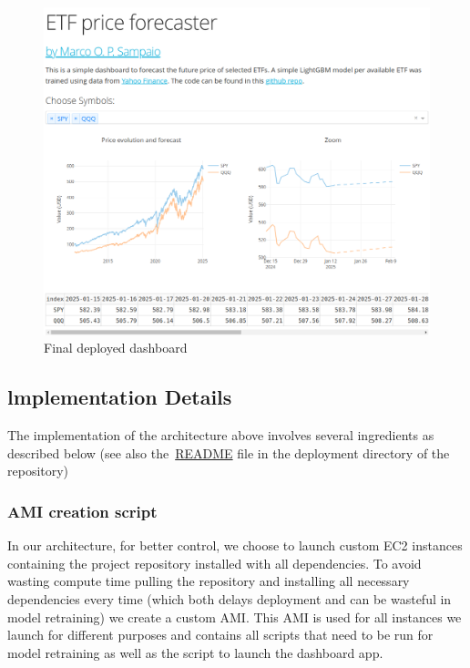 \documentclass[10pt]{article}
\begin{document}
\par\null{}
\begin{figure}[H]
\begin{center}
\includegraphics[width=0.98\columnwidth]{figures/screenshot81/screenshot81}
\caption{{Final deployed dashboard~
{\label{445301}}%
}}
\end{center}
\end{figure}

\hypertarget{lmplementation-details}{%
\subsection{lmplementation Details}}

{\label{673802}}

The implementation of the architecture above involves several
ingredients as described below (see also
the~\href{https://github.com/marcoopsampaio/aws_ml_eng_project_stock_prediction/tree/main/stock_prediction/deployment}{README}
file in the deployment directory of the repository)

\hypertarget{ami-creation-script}{%
\subsubsection{AMI creation script}}

{\label{613034}}

In our architecture, for better control, we choose to launch custom EC2
instances containing the project repository installed with all
dependencies. To avoid wasting compute time pulling the repository and
installing all necessary dependencies every time (which both delays
deployment and can be wasteful in model retraining) we create a custom
AMI. This AMI is used for all instances we launch for different purposes
and contains all scripts that need to be run for model retraining as
well as the script to launch the dashboard app.
\end{document}
